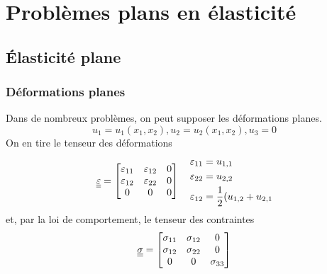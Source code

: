 
\chapter{Problèmes plans en élasticité}\label{chap:Ch08}
\section{Élasticité plane}\label{sec:Ch08-1}
\subsection{Déformations planes}\label{ssec:Ch08-1.1}
Dans de nombreux problèmes, on peut supposer les déformations planes.
\begin{equation}
    u_1=u_1(x_1,x_2), u_2=u_2(x_1,x_2), u_3=0
    \label{eq:Ch08-001}
\end{equation}
On en tire le tenseur des déformations 
\begin{equation}
    \underline{\underline{\varepsilon}}=
    \begin{bmatrix}
        \varepsilon_{11} & \varepsilon_{12} & 0 \\
        \varepsilon_{12} & \varepsilon_{22} & 0 \\
        0                & 0                & 0 \\     
    \end{bmatrix}
    \quad
    \begin{aligned}
         \varepsilon_{11}&= u_{1,1} \\
         \varepsilon_{22}&= u_{2,2} \\
         \varepsilon_{12}&= \frac{1}{2}(u_{1,2}+u_{2,1} 
    \end{aligned}
\label{eq:Ch08-002}
\end{equation}
et, par la loi de comportement, le tenseur des contraintes
\begin{equation}
    \underline{\underline{\sigma}} =
    \begin{bmatrix}
        \sigma_{11} & \sigma_{12} & 0           \\
        \sigma_{12} & \sigma_{22} & 0           \\
        0           & 0           & \sigma_{33} \\     
    \end{bmatrix}
\label{eq:Ch08-003}
\end{equation}
